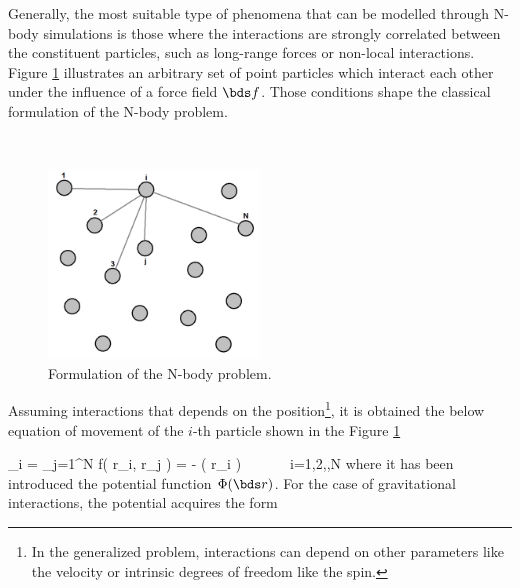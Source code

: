 Generally, the most suitable type of phenomena that can be modelled through 
N-body simulations is those where the interactions are strongly correlated 
between the constituent particles, such as long-range forces or non-local 
interactions. Figure \ref{fig:NbodyProblem} illustrates an arbitrary set 
of point particles which interact each other under the influence of a 
force field $\bds f$. Those conditions shape the classical formulation of 
the N-body problem.


\
\begin{figure}[htbp]
	\centering
	\includegraphics[width=0.50\textwidth]
	{./figures/3_nbody_simulations/Nbody_Problem.png}

	\caption{\small{Formulation of the N-body problem.}}
	
	\label{fig:NbodyProblem}
\end{figure}


Assuming interactions that depends on the position\footnote{ In the 
generalized problem, interactions can depend on other parameters like 
the velocity or intrinsic degrees of freedom like the spin.}, it is 
obtained the below equation of movement of the $i$-th particle shown in 
the Figure \ref{fig:NbodyProblem} \cite{pfalzner1996} \cite{binney2008} 


{ _i = \sum_{j=1}^N \bds f( \bds r_i, \bds r_j ) = -\nabla 
\phi( \bds r_i )\ \ \ \ \ \ \ i=1,2,\cdots,N }
where it has been introduced the potential function $\Phi(\bds r)$. For
the case of gravitational interactions, the potential acquires the form



